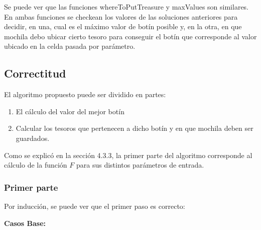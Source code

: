 Se puede ver que las funciones whereToPutTreasure y maxValues son similares. En ambas funciones se checkean los valores de las soluciones anteriores para decidir, en una, cual es el máximo valor de botín posible y, en la otra, en que mochila debo ubicar cierto tesoro para conseguir el botín que corresponde al valor ubicado en la celda pasada por parámetro.

\subsection{Correctitud}
El algoritmo propuesto puede ser dividido en partes:
\begin{enumerate}
    \item El cálculo del valor del mejor botín
    \item Calcular los tesoros que pertenecen a dicho botín y en que mochila deben ser guardados.
\end{enumerate}

Como se explicó en la sección 4.3.3, la primer parte del algoritmo corresponde al cálculo de la función $F$ para sus distintos parámetros de entrada.

\subsubsection{Primer parte}
Por inducción, se puede ver que el primer paso es correcto:

\textbf{Casos Base:}

